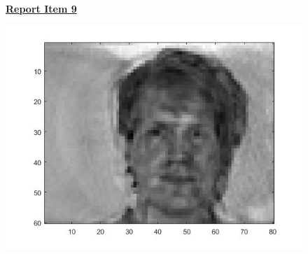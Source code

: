\documentclass{article}
\begin{document}
\begin{figure}[H]
  \color{red}
  \underline{\textbf{Report Item 9}}
  \color{black}

\includegraphics[scale =.5]{report8}
\end{figure}
\end{document}
